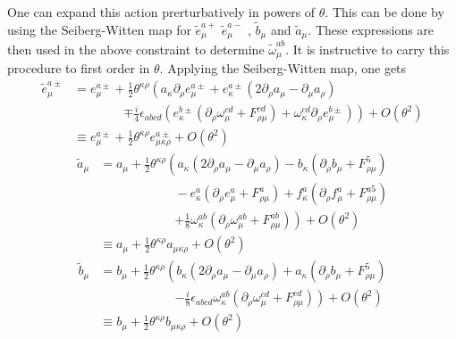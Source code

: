 \documentclass[a4paper,a4paper]{article}
\begin{document}
One can expand this action prerturbatively in powers of $\theta.$ This can be
done by using the Seiberg-Witten map for $\widetilde{e}_{\mu}^{a+}$
$\widetilde{e}_{\mu}^{a-}$ , $\widetilde{b}_{\mu}$ and $\widetilde{a}_{\mu}.$
These expressions are then used in the above constraint to determine
$\widetilde{\omega}_{\mu}^{ab}.$ It is instructive to carry this procedure to
first order in $\theta.$ Applying the Seiberg-Witten map, one gets
\begin{align*}
\widetilde{e}_{\mu}^{a\pm}  &  =e_{\mu}^{a\pm}+\frac{1}{2}\theta^{\kappa\rho
}\left(  a_{\kappa}\partial_{\rho}e_{\mu}^{a\pm}+e_{\kappa}^{a\pm}\left(
2\partial_{\rho}a_{\mu}-\partial_{\mu}a_{\rho}\right)  \right. \\
&  \qquad\qquad\left.  \mp\frac{i}{4}\epsilon_{abcd}\left(  e_{\kappa}^{b\pm
}\left(  \partial_{\rho}\omega_{\mu}^{cd}+F_{\rho\mu}^{cd}\right)
+\omega_{\kappa}^{cd}\partial_{\rho}e_{\mu}^{b\pm}\right)  \right)
+O(\theta^{2})\\
&  \equiv e_{\mu}^{a\pm}+\frac{1}{2}\theta^{\kappa\rho}e_{\mu\kappa\rho}%
^{a\pm}+O(\theta^{2})
\end{align*}%
\begin{align*}
\widetilde{a}_{\mu}  &  =a_{\mu}+\frac{1}{2}\theta^{\kappa\rho}\left(
a_{\kappa}\left(  2\partial_{\rho}a_{\mu}-\partial_{\mu}a_{\rho}\right)
-b_{\kappa}\left(  \partial_{\rho}b_{\mu}+F_{\rho\mu}^{5}\right)  \right. \\
&  \qquad\qquad\qquad-e_{\kappa}^{a}\left(  \partial_{\rho}e_{\mu}^{a}%
+F_{\rho\mu}^{a}\right)  +f_{\kappa}^{a}\left(  \partial_{\rho}f_{\mu}%
^{a}+F_{\rho\mu}^{a5}\right) \\
&  \qquad\qquad\qquad\left.  +\frac{1}{8}\omega_{\kappa}^{ab}\left(
\partial_{\rho}\omega_{\mu}^{ab}+F_{\rho\mu}^{ab}\right)  \right)
+O(\theta^{2})\\
&  \equiv a_{\mu}+\frac{1}{2}\theta^{\kappa\rho}a_{\mu\kappa\rho}+O(\theta
^{2})
\end{align*}%
\begin{align*}
\widetilde{b}_{\mu}  &  =b_{\mu}+\frac{1}{2}\theta^{\kappa\rho}\left(
b_{\kappa}\left(  2\partial_{\rho}a_{\mu}-\partial_{\mu}a_{\rho}\right)
+a_{\kappa}\left(  \partial_{\rho}b_{\mu}+F_{\rho\mu}^{5}\right)  \right. \\
&  \qquad\qquad\qquad\left.  -\frac{i}{8}\epsilon_{abcd}\omega_{\kappa}%
^{ab}\left(  \partial_{\rho}\omega_{\mu}^{cd}+F_{\rho\mu}^{cd}\right)
\right)  +O(\theta^{2})\\
&  \equiv b_{\mu}+\frac{1}{2}\theta^{\kappa\rho}b_{\mu\kappa\rho}+O(\theta
^{2})
\end{align*}
\end{document}
